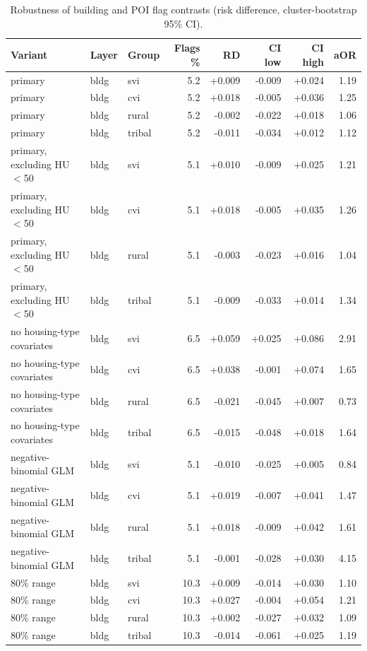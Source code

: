 {\footnotesize
\begin{longtable}{lllrrrrr}
\caption{Robustness of building and POI flag contrasts (risk difference, cluster-bootstrap 95\% CI).}\label{tab:robust}\\
\toprule
Variant & Layer & Group & Flags \% & RD & CI low & CI high & aOR \\
\midrule
\endhead
primary & bldg & svi & 5.2 & +0.009 & -0.009 & +0.024 & 1.19 \\
primary & bldg & cvi & 5.2 & +0.018 & -0.005 & +0.036 & 1.25 \\
primary & bldg & rural & 5.2 & -0.002 & -0.022 & +0.018 & 1.06 \\
primary & bldg & tribal & 5.2 & -0.011 & -0.034 & +0.012 & 1.12 \\
primary, excluding HU$<$50 & bldg & svi & 5.1 & +0.010 & -0.009 & +0.025 & 1.21 \\
primary, excluding HU$<$50 & bldg & cvi & 5.1 & +0.018 & -0.005 & +0.035 & 1.26 \\
primary, excluding HU$<$50 & bldg & rural & 5.1 & -0.003 & -0.023 & +0.016 & 1.04 \\
primary, excluding HU$<$50 & bldg & tribal & 5.1 & -0.009 & -0.033 & +0.014 & 1.34 \\
no housing-type covariates & bldg & svi & 6.5 & +0.059 & +0.025 & +0.086 & 2.91 \\
no housing-type covariates & bldg & cvi & 6.5 & +0.038 & -0.001 & +0.074 & 1.65 \\
no housing-type covariates & bldg & rural & 6.5 & -0.021 & -0.045 & +0.007 & 0.73 \\
no housing-type covariates & bldg & tribal & 6.5 & -0.015 & -0.048 & +0.018 & 1.64 \\
negative-binomial GLM & bldg & svi & 5.1 & -0.010 & -0.025 & +0.005 & 0.84 \\
negative-binomial GLM & bldg & cvi & 5.1 & +0.019 & -0.007 & +0.041 & 1.47 \\
negative-binomial GLM & bldg & rural & 5.1 & +0.018 & -0.009 & +0.042 & 1.61 \\
negative-binomial GLM & bldg & tribal & 5.1 & -0.001 & -0.028 & +0.030 & 4.15 \\
80\% range & bldg & svi & 10.3 & +0.009 & -0.014 & +0.030 & 1.10 \\
80\% range & bldg & cvi & 10.3 & +0.027 & -0.004 & +0.054 & 1.21 \\
80\% range & bldg & rural & 10.3 & +0.002 & -0.027 & +0.032 & 1.09 \\
80\% range & bldg & tribal & 10.3 & -0.014 & -0.061 & +0.025 & 1.19 \\

\end{longtable}}
